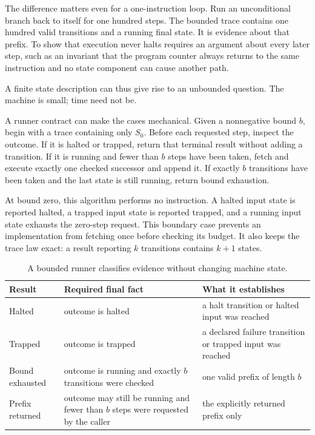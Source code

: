 The difference matters even for a one-instruction loop. Run an unconditional
branch back to itself for one hundred steps. The bounded trace contains one
hundred valid transitions and a running final state. It is evidence about that
prefix. To show that execution never halts requires an argument about every
later step, such as an invariant that the program counter always returns to the
same instruction and no state component can cause another path.

A finite state description can thus give rise to an unbounded question. The
machine is small; time need not be.

A runner contract can make the cases mechanical. Given a nonnegative bound
\(b\), begin with a trace containing only \(S_0\). Before each requested
step, inspect the outcome. If it is halted or trapped, return that terminal
result without adding a transition. If it is running and fewer than \(b\)
steps have been taken, fetch and execute exactly one checked successor and
append it. If exactly \(b\) transitions have been taken and the last state is
still running, return bound exhaustion.

At bound zero, this algorithm performs no instruction. A halted input state is
reported halted, a trapped input state is reported trapped, and a running input
state exhausts the zero-step request. This boundary case prevents an
implementation from fetching once before checking its budget. It also keeps
the trace law exact: a result reporting \(k\) transitions contains \(k+1\)
states.

\begin{table}
\centering
\caption{A bounded runner classifies evidence without changing machine state.}
\begin{tabular}{p{}p{}p{}}
\toprule
Result & Required final fact & What it establishes \\
\midrule
Halted & outcome is halted & a halt transition or halted input was reached \\
Trapped & outcome is trapped & a declared failure transition or trapped input was reached \\
Bound exhausted & outcome is running and exactly \(b\) transitions were checked & one valid prefix of length \(b\) \\
Prefix returned & outcome may still be running and fewer than \(b\) steps were requested by the caller & the explicitly returned prefix only \\
\bottomrule
\end{tabular}
\end{table}

